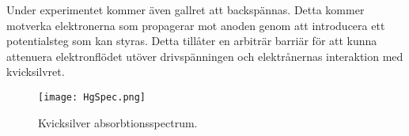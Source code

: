 Under experimentet kommer även gallret att backspännas. Detta kommer motverka elektronerna som propagerar mot anoden genom att introducera ett potentialsteg som kan styras. Detta tillåter en arbiträr barriär för att kunna attenuera elektronflödet utöver drivspänningen och elektrånernas interaktion med kvicksilvret. 

\begin{figure}[h]
	\centering
	\texttt{[image: HgSpec.png]}
	\caption{Kvicksilver absorbtionsspectrum.\cite{astronoo}}
	\label{fig:hgspec}
\end{figure}

